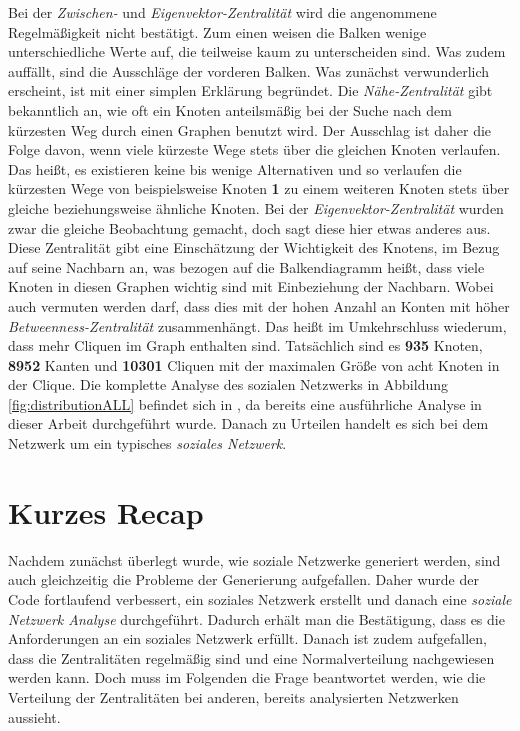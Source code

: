 Bei der \textit{Zwischen-} und \textit{Eigenvektor-Zentralität} wird die angenommene Regelmäßigkeit nicht bestätigt. Zum einen weisen die Balken wenige unterschiedliche Werte auf, die teilweise kaum zu unterscheiden sind. Was zudem auffällt, sind die Ausschläge der vorderen Balken. Was zunächst verwunderlich erscheint, ist mit einer simplen Erklärung begründet. Die \textit{Nähe-Zentralität} gibt bekanntlich an, wie oft ein Knoten anteilsmäßig bei der Suche nach dem kürzesten Weg durch einen Graphen benutzt wird. Der Ausschlag ist daher die Folge davon, wenn viele kürzeste Wege stets über die gleichen Knoten verlaufen. Das heißt, es existieren keine bis wenige Alternativen und so verlaufen die kürzesten Wege von beispielsweise Knoten \textbf{1} zu einem weiteren Knoten stets über gleiche beziehungsweise ähnliche Knoten. Bei der \textit{Eigenvektor-Zentralität} wurden zwar die gleiche Beobachtung gemacht, doch sagt diese hier etwas anderes aus. Diese Zentralität gibt eine Einschätzung der Wichtigkeit des Knotens, im Bezug auf seine Nachbarn an, was bezogen auf die Balkendiagramm heißt, dass viele Knoten in diesen Graphen wichtig sind mit Einbeziehung der Nachbarn. Wobei auch vermuten werden darf, dass dies mit der hohen Anzahl an Konten mit höher \textit{Betweenness-Zentralität} zusammenhängt.\newpage
Das heißt im Umkehrschluss wiederum, dass mehr Cliquen im Graph enthalten sind. Tatsächlich sind es \textbf{935} Knoten, \textbf{8952} Kanten und \textbf{10301} Cliquen mit der maximalen Größe von acht Knoten in der Clique.
Die komplette Analyse des sozialen Netzwerks in Abbildung \ref{fig:distributionALL} befindet sich in \cite{TZ}, da bereits eine ausführliche Analyse in dieser Arbeit durchgeführt wurde. Danach zu Urteilen handelt es sich bei dem Netzwerk um ein typisches \textit{soziales Netzwerk}.

\section{Kurzes Recap}
Nachdem zunächst überlegt wurde, wie soziale Netzwerke generiert werden, sind auch gleichzeitig die Probleme der Generierung aufgefallen. Daher wurde der Code fortlaufend verbessert, ein soziales Netzwerk erstellt und danach eine \textit{soziale Netzwerk Analyse} durchgeführt. Dadurch erhält man die Bestätigung, dass es die Anforderungen an ein soziales Netzwerk erfüllt. Danach ist zudem aufgefallen, dass die Zentralitäten regelmäßig sind und eine Normalverteilung nachgewiesen werden kann. Doch muss im Folgenden die Frage beantwortet werden, wie die Verteilung der Zentralitäten bei anderen, bereits analysierten Netzwerken aussieht.
